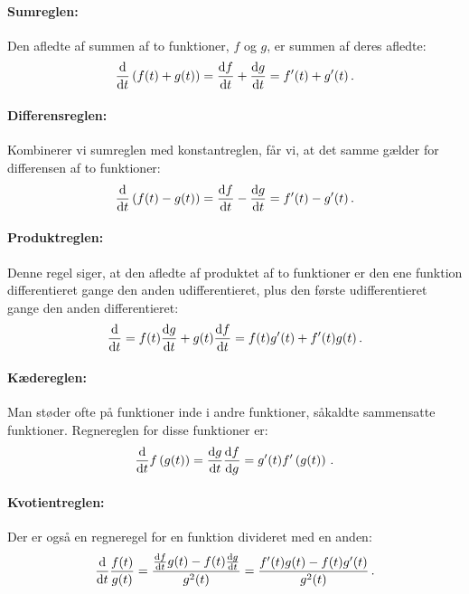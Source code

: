 \paragraph*{Sumreglen:} Den afledte af summen af to funktioner, $f$ og $g$, er summen af deres afledte:
\begin{equation}
    \dv{}{t}\left(f(t)+g(t)\right)=\dv{f}{t}+\dv{g}{t}=f'(t)+g'(t) \, .
\end{equation}
\paragraph*{Differensreglen:} Kombinerer vi sumreglen med konstantreglen, får vi, at det samme gælder for differensen af to funktioner:
\begin{equation}
    \dv{}{t}\left(f(t)-g(t)\right)=\dv{f}{t}-\dv{g}{t}=f'(t)-g'(t) \, .
\end{equation}
\paragraph*{Produktreglen:} Denne regel siger, at den afledte af produktet af to funktioner er den ene funktion differentieret gange den anden udifferentieret, plus den første udifferentieret gange den anden differentieret: 
\begin{equation}
    \dv{}{t} (f(t)\cdot g(t))=f(t)\dv{g}{t}+g(t)\dv{f}{t}=f(t)g'(t)+f'(t)g(t) \, .
\end{equation}
\paragraph*{Kædereglen:} Man støder ofte på funktioner inde i andre funktioner, såkaldte sammensatte funktioner. Regnereglen for disse funktioner er:
\begin{equation}
    \dv{}{t} f\left(g(t)\right)=\dv{g}{t}\dv{f}{g}=g'(t)f'\left(g(t)\right) \, .
\end{equation}
\paragraph*{Kvotientreglen:} Der er også en regneregel for en funktion divideret med en anden:
\begin{equation}
    \dv{}{t} \frac{f(t)}{g(t)} = \frac{\dv{f}{t}g(t)-f(t)\dv{g}{t}}{g^2(t)}=\frac{f'(t)g(t)-f(t)g'(t)}{g^2(t)} \, .
\end{equation}

